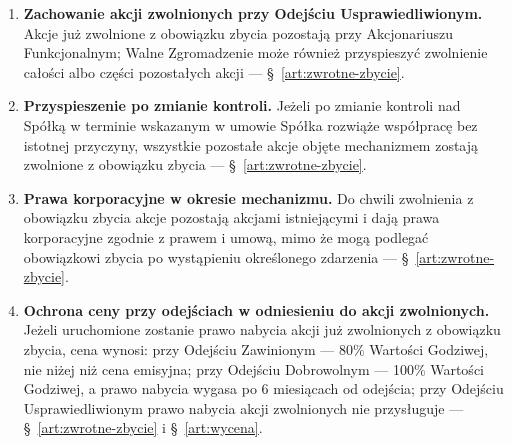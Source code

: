 \documentclass[12pt,a4paper]{report}
\begin{document}
\begin{enumerate}
  \item \textbf{Zachowanie akcji zwolnionych przy Odejściu Usprawiedliwionym.} Akcje już zwolnione z obowiązku zbycia pozostają przy Akcjonariuszu Funkcjonalnym; Walne Zgromadzenie może również przyspieszyć zwolnienie całości albo części pozostałych akcji --- §~\ref{art:zwrotne-zbycie}.
  \item \textbf{Przyspieszenie po zmianie kontroli.} Jeżeli po zmianie kontroli nad Spółką w terminie wskazanym w umowie Spółka rozwiąże współpracę bez istotnej przyczyny, wszystkie pozostałe akcje objęte mechanizmem zostają zwolnione z obowiązku zbycia --- §~\ref{art:zwrotne-zbycie}.
  \item \textbf{Prawa korporacyjne w okresie mechanizmu.} Do chwili zwolnienia z obowiązku zbycia akcje pozostają akcjami istniejącymi i dają prawa korporacyjne zgodnie z prawem i umową, mimo że mogą podlegać obowiązkowi zbycia po wystąpieniu określonego zdarzenia --- §~\ref{art:zwrotne-zbycie}.
  \item \textbf{Ochrona ceny przy odejściach w odniesieniu do akcji zwolnionych.} Jeżeli uruchomione zostanie prawo nabycia akcji już zwolnionych z obowiązku zbycia, cena wynosi: przy Odejściu Zawinionym --- 80\% Wartości Godziwej, nie niżej niż cena emisyjna; przy Odejściu Dobrowolnym --- 100\% Wartości Godziwej, a prawo nabycia wygasa po 6 miesiącach od odejścia; przy Odejściu Usprawiedliwionym prawo nabycia akcji zwolnionych nie przysługuje --- §~\ref{art:zwrotne-zbycie} i §~\ref{art:wycena}.
\end{enumerate}
\end{document}

